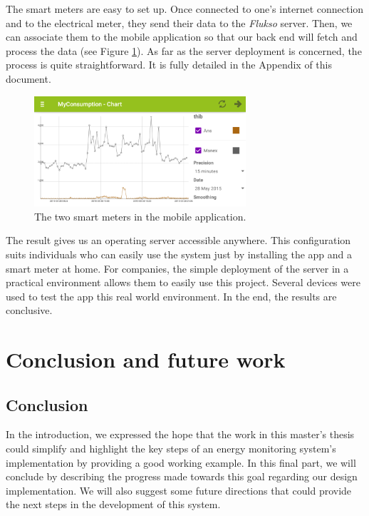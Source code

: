 \documentclass[a4paper, oneside, 11pt]{book}
\newcommand\partcontent{}
\begin{document}
The smart meters are easy to set up. Once connected to one’s internet connection and to the electrical meter, they send their data to the \textit{Flukso} server. Then, we can associate them to the mobile application so that our back end will fetch and process the data (see Figure \ref{fig:chart}). As far as the server deployment is concerned, the process is quite straightforward. It is fully detailed in the Appendix of this document. 

\begin{figure}[htbp]
	\centerline{\includegraphics[width=0.7\textwidth]{chart.png}}
	\caption{The two smart meters in the mobile application.}
	\label{fig:chart}
\end{figure}


The result gives us an operating server accessible anywhere. This configuration suits individuals who can easily use the system just by installing the app and a smart meter at home. For companies, the simple deployment of the server in a practical environment allows them to easily use this project. Several devices were used to test the app this real world environment. In the end, the results are conclusive.



\part{Conclusion and future work}
\renewcommand\partcontent{CONCLUSIONS: }

\chapter{Conclusion}
In the introduction, we expressed the hope that the work in this master’s thesis could simplify and highlight the key steps of an energy monitoring system's implementation by providing a good working example. In this final part, we will conclude by describing the progress made towards this goal regarding our design implementation. We will also suggest some future directions that could provide the next steps in the development of this system. \\
\end{document}
